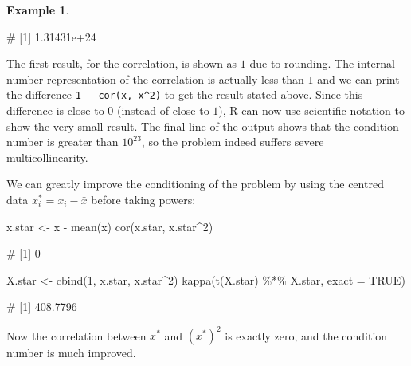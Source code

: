 \documentclass[
  a4paper,
]{article}
\newenvironment{Shaded}{\begin{snugshade}}{\end{snugshade}}
\newcommand{\AttributeTok}[1]{\textcolor[rgb]{0.77,0.63,0.00}{#1}}
\newcommand{\ConstantTok}[1]{\textcolor[rgb]{0.00,0.00,0.00}{#1}}
\newcommand{\DecValTok}[1]{\textcolor[rgb]{0.00,0.00,0.81}{#1}}
\newcommand{\FunctionTok}[1]{\textcolor[rgb]{0.00,0.00,0.00}{#1}}
\newcommand{\NormalTok}[1]{#1}
\newcommand{\OtherTok}[1]{\textcolor[rgb]{0.56,0.35,0.01}{#1}}
\newcommand{\SpecialCharTok}[1]{\textcolor[rgb]{0.00,0.00,0.00}{#1}}
\theoremstyle{definition}
\theoremstyle{definition}
\newtheorem{example}{Example}[section]
\theoremstyle{definition}
\theoremstyle{definition}
\theoremstyle{remark}
\begin{document}
\begin{example}
\begin{Shaded}
\begin{Highlighting}[]
\NormalTok{\# [1] 1.31431e+24}
\end{Highlighting}
\end{Shaded}

The first result, for the correlation, is shown as \(1\) due to rounding.
The internal number representation of the correlation is actually less than
\(1\) and we can print the difference \texttt{1\ -\ cor(x,\ x\^{}2)} to get the result
stated above. Since this difference is close to \(0\) (instead of close to \(1\)),
R can now use scientific notation to show the very small result. The final line
of the output shows that the condition number is greater than \(10^{23}\),
so the problem indeed suffers severe multicollinearity.

We can greatly improve the conditioning of the problem
by using the centred data \(x^\ast_i = x_i - \bar x\) before taking powers:

\begin{Shaded}
\begin{Highlighting}[]
\NormalTok{x.star }\OtherTok{\textless{}{-}}\NormalTok{ x }\SpecialCharTok{{-}} \FunctionTok{mean}\NormalTok{(x)}
\FunctionTok{cor}\NormalTok{(x.star, x.star}\SpecialCharTok{\^{}}\DecValTok{2}\NormalTok{)}
\end{Highlighting}
\end{Shaded}

\begin{Shaded}
\begin{Highlighting}[]
\NormalTok{\# [1] 0}
\end{Highlighting}
\end{Shaded}

\begin{Shaded}
\begin{Highlighting}[]
\NormalTok{X.star }\OtherTok{\textless{}{-}} \FunctionTok{cbind}\NormalTok{(}\DecValTok{1}\NormalTok{, x.star, x.star}\SpecialCharTok{\^{}}\DecValTok{2}\NormalTok{)}
\FunctionTok{kappa}\NormalTok{(}\FunctionTok{t}\NormalTok{(X.star) }\SpecialCharTok{\%*\%}\NormalTok{ X.star, }\AttributeTok{exact =} \ConstantTok{TRUE}\NormalTok{)}
\end{Highlighting}
\end{Shaded}

\begin{Shaded}
\begin{Highlighting}[]
\NormalTok{\# [1] 408.7796}
\end{Highlighting}
\end{Shaded}

Now the correlation between \(x^\ast\) and \((x^\ast)^2\) is exactly zero,
and the condition number is much improved.
\end{example}
\end{document}
